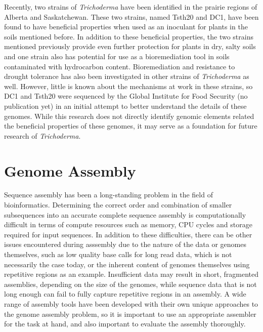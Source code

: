 Recently, two strains of \textit{Trichoderma}
have been identified in the prairie regions of Alberta and
Saskatchewan. These two strains, named Tsth20 and DC1, have been found
to have beneficial properties when used as an inoculant for plants in
the soils mentioned before. In addition to these beneficial
properties, the two strains mentioned previously provide even further
protection for plants in dry, salty soils and one strain also has
potential for use as a bioremediation tool in soils contaminated with
hydrocarbon content. Bioremediation and resistance to drought
tolerance has also been investigated in other strains of
\textit{Trichoderma} as well\cite{10.3389/fpls.2023.1190304}. However,
little is known about the mechanisms at work in these strains, so DC1
and Tsth20 were sequenced by the Global Institute for Food Security
(no publication yet) in an initial attempt to better understand the
details of these genomes. While this research does not directly
identify genomic elements related the beneficial properties of these
genomes, it may serve as a foundation for future research of
\textit{Trichoderma}.

\section{Genome Assembly}

Sequence assembly has been a long-standing problem in the field of
bioinformatics\cite{Nagarajan2013}. Determining the correct order and
combination of smaller subsequences into an accurate complete sequence
assembly is computationally difficult in terms of compute resources
such as memory, CPU cycles and storage required for input
sequences\cite{Nagarajan2013}. In addition to these difficulties,
there can be other issues encountered during asssembly due to the
nature of the data or genomes themselves, such as low quality base
calls for long read data, which is not necessarily the case today, or
the inherent content of genomes themselves using repetitive regions as
an example. Insufficient data may result in short, fragmented
assemblies, depending on the size of the genomes, while sequence data
that is not long enough can fail to fully capture repetitive regions
in an assembly. A wide range of assembly tools have been developed
with their own unique approaches to the genome assembly problem, so it
is important to use an appropriate assembler for the task at hand, and
also important to evaluate the assembly thoroughly.

